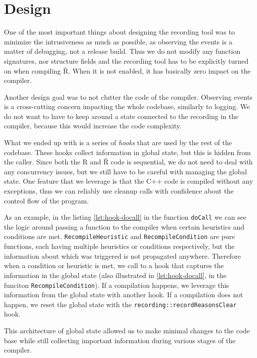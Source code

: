 \section{Design}

One of the most important things about designing the recording tool was to minimize the intrusiveness as much as possible, as observing the events is a matter of debugging, not a release build. Thus we do not modify any function signatures, nor structure fields and the recording tool has to be explicitly turned on when compiling Ř. When it is not enabled, it has basically zero impact on the compiler.

Another design goal was to not clutter the code of the compiler. Observing events is a cross-cutting concern impacting the whole codebase, similarly to logging. We do not want to have to keep around a state connected to the recording in the compiler, because this would increase the code complexity.

What we ended up with is a series of \textit{hooks} that are used by the rest of the codebase. These hooks collect information in global state, but this is hidden from the caller. Since both the R and Ř code is sequential, we do not need to deal with any concurrency issues, but we still have to be careful with managing the global state. One feature that we leverage is that the C++ code is compiled without any exceptions, thus we can reliably use cleanup calls with confidence about the control flow of the program.

As an example, in the listing \ref{lst:hook-docall} in the function \texttt{doCall} we can see the logic around passing a function to the compiler when certain heuristics and conditions are met. \texttt{RecompileHeuristic} and \texttt{RecompileCondition} are pure functions, each having multiple heuristics or conditions respectively, but the information about which was triggered is not propagated anywhere. Therefore when a condition or heuristic is met, we call to a hook that captures the information in the global state (also illustrated in \ref{lst:hook-docall}, in the funciton \texttt{RecompileCondition}). If a compilation happens, we leverage this information from the global state with another hook. If a compilation does not happen, we reset the global state with the \texttt{recording::recordReasonsClear} hook.

This architecture of global state allowed us to make minimal changes to the code base while still collecting important information during various stages of the compiler.

